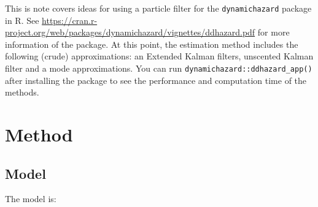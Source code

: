 \newcommand{\Lbrace}[1]{\left\{ #1\right\}}
\newcommand{\Lparen}[1]{\left( #1\right)}
\newcommand{\Cond}[2]{\left. #1 \vphantom{#2} \right\vert  #2}

\newcommand{\Prob}{P}
\newcommand{\VAR}{Var}
\newcommand{\E}{E}

\newcommand{\optor}[2]{#1\Lparen{#2}}
\newcommand{\optorC}[3]{\optor{#1}{\Cond{#2}{#3}}}

\newcommand{\prop}[1]{\optor{\Prob}{#1}}
\newcommand{\propC}[2]{\optorC{\Prob}{#1}{#2}}

\newcommand{\expec}[1]{\optor{\E}{#1}}
\newcommand{\expecC}[2]{\optorC{\E}{#1}{#2}}

\newcommand{\varp}[1]{\optor{\VAR}{#1}}
\newcommand{\varpC}[2]{\optorC{\VAR}{#1}{#2}}

\newcommand{\propAproxC}[2]{\optorC{\widetilde{p}}{#1}{#2}}

\newcommand{\normal}[2]{\optor{N}{#1,#2}}
\newcommand{\normalC}[3]{\optorC{N}{#1}{#2,#3}}

\newcommand{\IDC}[2]{\optorC{q}{#1}{#2}}
\newcommand{\IDAproxC}[2]{\optorC{\widetilde{q}}{#1}{#2}}

\newcommand{\KF}[3]{#1_{\left. #2 \right\vert #3}}
\newcommand{\KFSup}[4]{#1_{\left. #2 \right\vert #3}^{(#4)}}

\newcommand{\partic}[3]{#1_{#2}^{\Lparen{#3}}}
\newcommand{\particB}[3]{\widetilde{#1}_{#2}^{\Lparen{#3}}}
\newcommand{\particS}[3]{\widehat{#1}_{#2}^{\Lparen{#3}}}

\newcommand{\bigO}[1]{\mathcal{O}\Lparen{#1}}


This is note covers ideas for using a particle filter for the \verb|dynamichazard| package in R. See \url{https://cran.r-project.org/web/packages/dynamichazard/vignettes/ddhazard.pdf} for more information of the package. At this point, the estimation method includes the following (crude) approximations: an Extended Kalman filters, unscented Kalman filter and a mode approximations. You can run \verb|dynamichazard::ddhazard_app()| after installing the package to see the performance and computation time of the methods.

\section{Method}
\subsection*{Model}
The model is:

